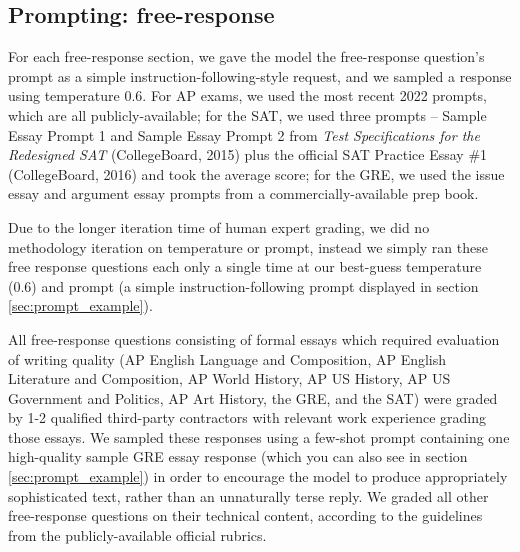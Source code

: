 \documentclass{article}
\begin{document}
\subsection{Prompting: free-response}
For each free-response section, we gave the model the free-response question's prompt as a simple instruction-following-style request, and we sampled a response using temperature 0.6. For AP exams, we used the most recent 2022 prompts, which are all publicly-available; for the SAT, we used three prompts -- Sample Essay Prompt 1 and Sample Essay Prompt 2 from \textit{Test Specifications for the Redesigned SAT} (CollegeBoard, 2015) plus the official SAT Practice Essay \#1 (CollegeBoard, 2016) and took the average score; for the GRE, we used the issue essay and argument essay prompts from a commercially-available prep book.

Due to the longer iteration time of human expert grading, we did no methodology iteration on temperature or prompt, instead we simply ran these free response questions each only a single time at our best-guess temperature (0.6) and prompt (a simple instruction-following prompt displayed in section \ref{sec:prompt_example}).

All free-response questions consisting of formal essays which required evaluation of writing quality (AP English Language and Composition, AP English Literature and Composition, AP World History, AP US History, AP US Government and Politics, AP Art History, the GRE, and the SAT) were graded by 1-2 qualified third-party contractors with relevant work experience grading those essays. We sampled these responses using a few-shot prompt containing one high-quality sample GRE essay response (which you can also see in section \ref{sec:prompt_example}) in order to encourage the model to produce appropriately sophisticated text, rather than an unnaturally terse reply. We graded all other free-response questions on their technical content, according to the guidelines from the publicly-available official rubrics.
\end{document}
